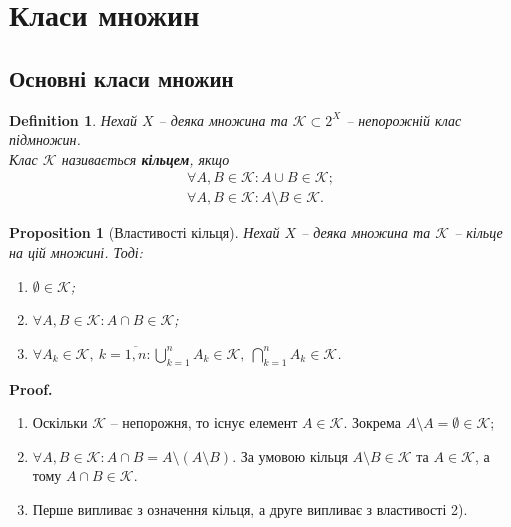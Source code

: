\documentclass[a4paper, 10pt]{article}
\makeatletter
\theoremstyle{theoremdd}
\newtheorem{definition}[theorem]{Definition}
\newtheorem{proposition}[theorem]{Proposition}
\renewenvironment{proof}[1][Proof.\\]{\par
\pushQED{\hfill \qed}%
\normalfont \topsep6\p@\@plus6\p@\relax
\trivlist
\item\relax
{\bfseries
#1\@addpunct{.}}\hspace\labelsep\ignorespaces
}{%
\popQED\endtrivlist\@endpefalse
}
\newcommand\nospacebeforeitem{
\vspace{-\topsep}
\vspace{-\topsep}
\vspace{-\topsep}
}
\makeatother
\begin{document}
\thispagestyle{empty}

\thispagestyle{empty}
\tableofcontents
\newpage

\section{Класи множин}
\subsection{Основні класи множин}
\begin{definition}
Нехай $X$ -- деяка множина та $\mathcal{K} \subset 2^X$ -- непорожній клас підмножин.\\
Клас $\mathcal{K}$ називається \textbf{кільцем}, якщо
\begin{align*}
\forall A,B \in \mathcal{K}: A \cup B \in \mathcal{K}; \\
\forall A,B \in \mathcal{K}: A \setminus B \in \mathcal{K}.
\end{align*}
\end{definition}

\begin{proposition}[Властивості кільця]
Нехай $X$ -- деяка множина та $\mathcal{K}$ -- кільце на цій множині. Тоді:
\begin{enumerate}[nosep,wide=0pt,label={\arabic*)}]
\item $\emptyset \in \mathcal{K}$;
\item $\forall A,B \in \mathcal{K}: A \cap B \in \mathcal{K}$;
\item $\forall A_k \in \mathcal{K},\ k = \overline{1,n}: \displaystyle\bigcup_{k=1}^n A_k \in \mathcal{K},\ \displaystyle\bigcap_{k=1}^n A_k \in \mathcal{K}$.
\end{enumerate}
\end{proposition}

\begin{proof}
\nospacebeforeitem
\begin{enumerate}[wide=0pt,label={\arabic*)}]
\item Оскільки $\mathcal{K}$ -- непорожня, то існує елемент $A \in \mathcal{K}$. Зокрема $A \setminus A = \emptyset \in \mathcal{K}$;
\item $\forall A,B \in \mathcal{K}: A \cap B = A \setminus (A \setminus B)$. За умовою кільця $A \setminus B \in \mathcal{K}$ та $A \in \mathcal{K}$, а тому $A \cap B \in \mathcal{K}$.
\item Перше випливає з означення кільця, а друге випливає з властивості 2). \qedhere
\end{enumerate}
\end{proof}
\end{document}
